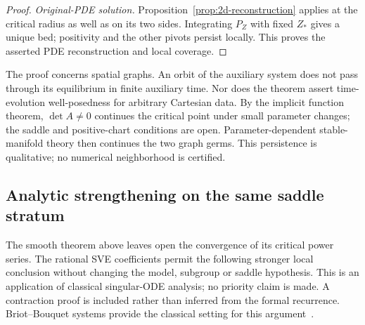 \documentclass[12pt,a4paper,oneside]{report}
\numberwithin{equation}{chapter}
\theoremstyle{remark}\newtheorem{remark}[theorem]{Remark}
\begin{document}
\begin{proof}
\emph{Original-PDE solution.} Proposition~\ref{prop:2d-reconstruction}
applies at the critical radius as well as on its two sides. Integrating $P_Z$
with fixed $Z_*$ gives a unique bed; positivity and the other pivots persist
locally. This proves the asserted PDE reconstruction and local coverage.
\end{proof}

The proof concerns spatial graphs. An orbit of the auxiliary system does
not pass through its equilibrium in finite auxiliary time. Nor does the
theorem assert time-evolution well-posedness for arbitrary Cartesian data.
By the implicit function theorem, $\det A\ne0$ continues the critical point
under small parameter changes; the saddle and positive-chart conditions are
open. Parameter-dependent stable-manifold theory
\cite[Theorem~9.6, p.~260]{teschl2012} then continues the two graph germs.
This persistence is qualitative; no numerical neighborhood is certified.

\subsection*{Analytic strengthening on the same saddle stratum}
The smooth theorem above leaves open the convergence of its critical
power series. The rational SVE coefficients permit the following stronger
local conclusion without changing the model, subgroup or saddle hypothesis.
This is an application of classical singular-ODE analysis; no priority claim
is made. A contraction proof is included rather than inferred from the
formal recurrence. Briot--Bouquet systems provide the classical setting
for this argument~\cite{westreich1982}.
\end{document}
